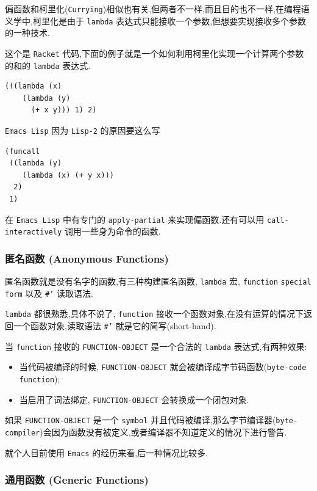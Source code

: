 \documentclass[11pt]{article}
\begin{document}
偏函数和柯里化(\texttt{Currying})相似也有关,但两者不一样,而且目的也不一样,在编程语义学中,柯里化是由于 \texttt{lambda} 表达式只能接收一个参数,但想要实现接收多个参数的一种技术.

这个是 \texttt{Racket} 代码,下面的例子就是一个如何利用柯里化实现一个计算两个参数的和的 \texttt{lambda} 表达式.

\begin{verbatim}
(((lambda (x)
    (lambda (y)
      (+ x y))) 1) 2)
\end{verbatim}

\texttt{Emacs Lisp} 因为 \texttt{Lisp-2} 的原因要这么写

\begin{verbatim}
(funcall
 ((lambda (y)
    (lambda (x) (+ y x)))
  2)
 1)
\end{verbatim}

在 \texttt{Emacs Lisp} 中有专门的 \texttt{apply-partial} 来实现偏函数.还有可以用 \texttt{call-interactively} 调用一些身为命令的函数.

\subsubsection{匿名函数 (Anonymous Functions)}
\label{sec:orgb2f4645}

匿名函数就是没有名字的函数,有三种构建匿名函数, \texttt{lambda} 宏, \texttt{function} \texttt{special form} 以及 \texttt{\#'} 读取语法.

\texttt{lambda} 都很熟悉,具体不说了, \texttt{function} 接收一个函数对象,在没有运算的情况下返回一个函数对象,读取语法 \texttt{\#'} 就是它的简写(short-hand).

当 \texttt{function} 接收的 \texttt{FUNCTION-OBJECT} 是一个合法的 \texttt{lambda} 表达式,有两种效果:

\begin{itemize}
\item 当代码被编译的时候, \texttt{FUNCTION-OBJECT} 就会被编译成字节码函数(\texttt{byte-code function});
\item 当启用了词法绑定, \texttt{FUNCTION-OBJECT} 会转换成一个闭包对象.
\end{itemize}

如果 \texttt{FUNCTION-OBJECT} 是一个 \texttt{symbol} 并且代码被编译,那么字节编译器(\texttt{byte-compiler})会因为函数没有被定义,或者编译器不知道定义的情况下进行警告.

就个人目前使用 \texttt{Emacs} 的经历来看,后一种情况比较多.



\subsubsection{通用函数 (Generic Functions)}
\label{sec:org0ae616d}
\end{document}
